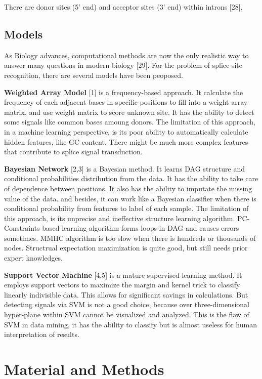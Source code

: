 \documentclass[11pt]{article}
\begin{document}
There are donor sites (5' end) and acceptor sites (3' end) within
introns {[}28{]}.

    \hypertarget{models}{%
\subsection{Models}\label{models}}

As Biology advances, computational methods are now the only realistic
way to answer many questions in modern biology {[}29{]}. For the problem
of splice site recognition, there are several models have been peoposed.

\textbf{Weighted Array Model} {[}1{]} is a frequency-based approach. It
calculate the frequency of each adjacent bases in specific positions to
fill into a weight array matrix, and use weight matrix to score unknown
site. It has the ability to detect some signals like common bases amoung
donors. The limitation of this approach, in a machine learning
perspective, is its poor ability to automatically calculate hidden
features, like GC content. There might be much more complex features
that contribute to splice signal transduction.

\textbf{Bayesian Network} {[}2,3{]} is a Bayesian method. It learns DAG
structure and conditional probabilities distribution from the data. It
has the ability to take care of dependence between positions. It also
has the ability to imputate the missing value of the data. and besides,
it can work like a Bayesian classifier when there is conditional
probability from features to label of each sample. The limitation of
this approach, is its unprecise and ineffective structure learning
algorithm. PC-Constraints based learning algorithm forms loops in DAG
and causes errors sometimes. MMHC algorithm is too slow when there is
hundreds or thousands of nodes. Structrual expectation maximization is
quite good, but still needs prior expert knowledges.

\textbf{Support Vector Machine} {[}4,5{]} is a mature supervised
learning method. It employs support vectors to maximize the margin and
kernel trick to classify linearly indivisible data. This allows for
significant savings in calculations. But detecting signals via SVM is
not a good choice, because over three-dimensional hyper-plane within SVM
cannot be visualized and analyzed. This is the flaw of SVM in data
mining, it has the ability to classify but is almost useless for human
interpretation of results.

    \hypertarget{material-and-method}{%
\section{Material and Methods}\label{material-and-method}}
\end{document}
